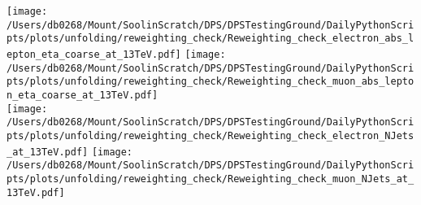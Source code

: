 \begin{figure*}[htpb]
	\centering
	\texttt{[image: /Users/db0268/Mount/SoolinScratch/DPS/DPSTestingGround/DailyPythonScripts/plots/unfolding/reweighting\_check/Reweighting\_check\_electron\_abs\_lepton\_eta\_coarse\_at\_13TeV.pdf]}
	\texttt{[image: /Users/db0268/Mount/SoolinScratch/DPS/DPSTestingGround/DailyPythonScripts/plots/unfolding/reweighting\_check/Reweighting\_check\_muon\_abs\_lepton\_eta\_coarse\_at\_13TeV.pdf]} \\
	\texttt{[image: /Users/db0268/Mount/SoolinScratch/DPS/DPSTestingGround/DailyPythonScripts/plots/unfolding/reweighting\_check/Reweighting\_check\_electron\_NJets\_at\_13TeV.pdf]}
	\texttt{[image: /Users/db0268/Mount/SoolinScratch/DPS/DPSTestingGround/DailyPythonScripts/plots/unfolding/reweighting\_check/Reweighting\_check\_muon\_NJets\_at\_13TeV.pdf]} \\
	\caption[]{}
	\label{fig:Bias3}
\end{figure*}